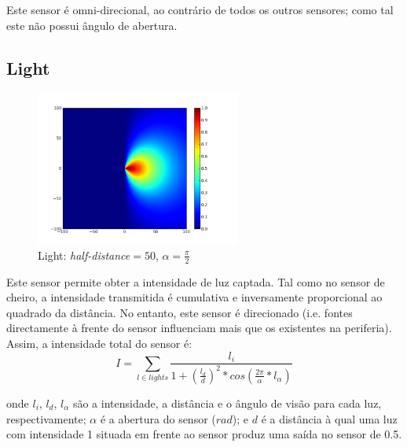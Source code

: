 \documentclass[a4paper]{article}
\begin{document}
Este sensor é omni-direcional, ao contrário de todos os outros sensores; como tal este não possui ângulo de abertura. 

\cleardoublepage
\subsection{Light}
\begin{figure}[h]
	\vspace{-20pt}
	\begin{center}
		\includegraphics[width=0.6\textwidth]{graphs/sensors/light.png}
	\end{center}
	\vspace{-20pt}
	\caption{Light: \emph{half-distance}$=50$, $\alpha=\frac{\pi}{2}$}
\end{figure}

\indent Este sensor permite obter a intensidade de luz captada. Tal como no sensor de cheiro, a intensidade transmitida
é cumulativa e inversamente proporcional ao quadrado da distância. No entanto, este sensor é direcionado (i.e. fontes
directamente à frente do sensor influenciam mais que os existentes na periferia). Assim, a intensidade total do sensor é:
\[
	I = \displaystyle\sum\limits_{l \in lights} \frac{l_{i}}{1 + (\frac{l_{d}}{d})^{2}*cos(\frac{2\pi}{\alpha}*l_{\alpha})}
\]

onde $l_{i}$, $l_{d}$, $l_{\alpha}$ são a intensidade, a distância e o ângulo de visão para cada luz, respectivamente;
$\alpha$ é a abertura do sensor ($rad$);
e $d$ é a distância à qual uma luz com intensidade 1 situada em frente ao sensor produz uma saída no sensor de 0.5.

\cleardoublepage
\end{document}
